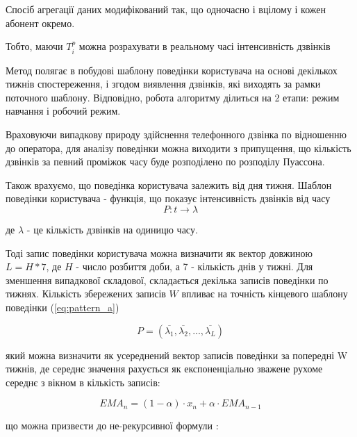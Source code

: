 Спосіб агрегації даних модифікований так, що одночасно і вцілому і кожен абонент окремо.\TBD %

Тобто, маючи ${T_i^p}$ можна 
розрахувати в 
реальному часі інтенсивність дзвінків\TBD


Метод полягає в побудові шаблону поведінки користувача на основі декількох тижнів спостереження, і згодом виявлення дзвінків, які виходять за рамки поточного шаблону. Відповідно, робота алгоритму ділиться на 2 етапи: режим навчання і робочий режим.

Враховуючи випадкову природу здійснення телефонного дзвінка по відношенню до оператора, для аналізу поведінки можна виходити з припущення, що кількість дзвінків за певний проміжок часу буде розподілено по розподілу Пуассона.

Також врахуємо, що поведінка користувача залежить від дня тижня. Шаблон поведінки користувача - функція, що показує інтенсивність дзвінків від часу
\begin{equation}\label{eq:pattern_a}P: t \rightarrow \lambda \end{equation}

\begin{ESKDexplanation}
  \item де $\lambda$ - це кількість дзвінків на одиницю часу.
\end{ESKDexplanation}

Тоді запис поведінки користувача можна визначити як вектор довжиною $L = H * 7$, де $H$ - число розбиття доби, а 7 - кількість днів у тижні. Для зменшення випадкової складової, складається декілька записів поведінки по тижнях. Кількість збережених записів $W$ впливає на точність кінцевого шаблону поведінки (\ref{eq:pattern_a})

\begin{equation}\label{eq:pattern_a2}P = (\overline{\lambda_1}, \overline{\lambda_2}, ..., \overline{\lambda_L}) \end{equation}

який можна визначити як усереднений вектор записів поведінки за попередні W тижнів, де середнє значення рахується як експоненціально зважене рухоме середнє з вікном в кількість записів:

\begin{equation}\label{eq:ema}EMA_n = (1-\alpha) \cdot x_n + \alpha \cdot EMA_{n-1} \end{equation}

що можна призвести до не-рекурсивної формули \cite{cargal1988discrete}:

